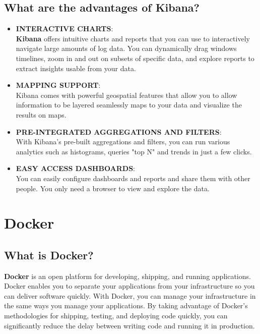 \begin{spacing}{1.5}
\subsection{What are the advantages of Kibana?}
\begin{itemize}
   \item \textbf{INTERACTIVE CHARTS}:\\
\textbf{Kibana} offers intuitive charts and reports that you can use to interactively navigate large amounts of log data. You can dynamically drag windows timelines, zoom in and out on subsets of specific data, and explore reports to extract insights usable from your data.\vspace{.25cm}
   \item \textbf{MAPPING SUPPORT}:\\
Kibana comes with powerful geospatial features that allow you to allow information to be layered seamlessly maps to your data and visualize the results on maps.\vspace{.25cm}
   \item \textbf{PRE-INTEGRATED AGGREGATIONS AND FILTERS}:\\
With Kibana's pre-built aggregations and filters, you can run various analytics such as histograms, queries "top N" and trends in just a few clicks.\vspace{.25cm}
   \item \textbf{EASY ACCESS DASHBOARDS}:\\
You can easily configure dashboards and reports and share them with other people. You only need a browser to view and explore the data.
\end{itemize}   
\newpage

\section{Docker} 
 \subsection{What is Docker?}
 \par \textbf{Docker} is an open platform for developing, shipping, and running applications. Docker enables you to separate your applications from your infrastructure so you can deliver software quickly. With Docker, you can manage your infrastructure in the same ways you manage your applications. By taking advantage of Docker’s methodologies for shipping, testing, and deploying code quickly, you can significantly reduce the delay between writing code and running it in production.
\\ 
 

\end{spacing}
